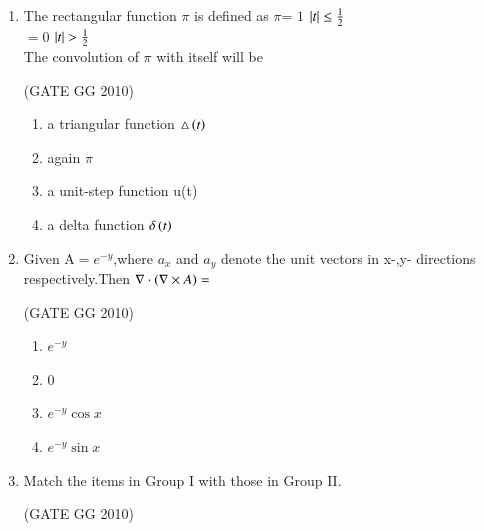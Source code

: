\documentclass[journal]{IEEEtran}
\begin{document}
\begin{enumerate}[start=26]
\item The rectangular function $\pi$ is defined as $\pi$= $1$ \hspace{0.7cm}   $\left\vert t\right\vert\leq \frac{1}{2}$\\
\hspace*{6.7cm} $=0$ \hspace{0.7cm} $\left\vert t\right\vert >\frac{1}{2}$\\
The convolution of $\pi$ with itself will be 

\hfill{(GATE GG 2010)}

\begin{enumerate}
    \item a triangular function $\triangle\left(t\right)$
    \item  again $\pi$
\item a unit-step function u(t)
\item a delta function $\delta\left(t\right)$
\end{enumerate}

\item Given A$=e^{-y}$,where ${a_x}$ and $a_y$ denote the unit vectors in x-,y- directions respectively.Then $\nabla\cdot\left(\nabla \times A\right)=$ 

\hspace*{15.7cm}(GATE GG 2010)

\begin{enumerate}
    \item $e^{-y}$
    \item 0
    \item $e^{-y}\cos{x}$
    \item $e^{-y}\sin{x}$
\end{enumerate}
\item Match the items in Group I with those in Group II.

\hfill{(GATE GG 2010)}\\


\end{enumerate}
\end{document}
